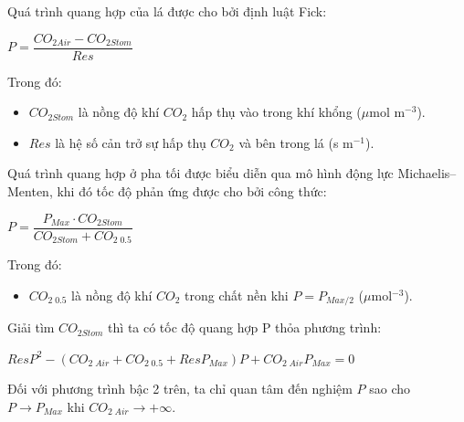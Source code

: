 \documentclass[a4paper]{article}
\begin{document}
    Quá trình quang hợp của lá được cho bởi định luật Fick:
    \begin{center}
        $P = \dfrac{CO_{2Air} - CO_{2Stom}}{Res}$
    \end{center}
    
    Trong đó:
    \begin{itemize}
        \item $CO_{2Stom}$ là nồng độ khí $CO_2$ hấp thụ vào trong khí khổng ($\mu$mol m$^{-3}$).
        \item $Res$ là hệ số cản trở sự hấp thụ $CO_2$ và bên trong  lá (s m$^{-1}$).
    \end{itemize}
    
    Quá trình quang hợp ở pha tối được biểu diễn qua mô hình động lực  Michaelis–Menten, khi đó tốc độ phản ứng được cho bởi công thức:
    \begin{center}
        $P = \dfrac{P_{Max} \cdot CO_{2Stom}}{CO_{2Stom} + CO_{2 \; 0.5}}$
    \end{center}
    Trong đó:
    \begin{itemize}
        \item $CO_{2 \; 0.5}$ là nồng độ khí $CO_2$ trong chất nền khi $P = P_{Max/2}$ ($\mu$mol$^{-3}$).
    \end{itemize}
    Giải tìm $CO_{2Stom}$ thì ta có tốc độ quang hợp P thỏa phương trình:
    \begin{center}
        $ResP^2 - (CO_{2 \; Air} + CO_{2\;0.5} + ResP_{Max})P + CO_{2\;Air}P_{Max} = 0$
    \end{center}
    Đối với phương trình bậc 2 trên, ta chỉ quan tâm đến nghiệm $P$ sao cho $P\rightarrow P_{Max}$ khi $CO_{2\;Air}\rightarrow+\infty$.
    
\end{document}
